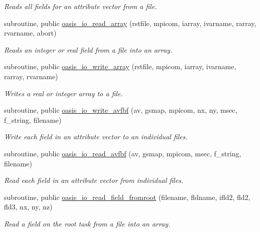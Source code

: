 \begin{DoxyCompactItemize}
\begin{DoxyCompactList}\small\item\em Reads all fields for an attribute vector from a file. \end{DoxyCompactList}\item 
subroutine, public \hyperlink{namespacemod__oasis__io_a8b604f89345d74c74c6bc3b4760b2e29}{oasis\+\_\+io\+\_\+read\+\_\+array} (rstfile, mpicom, iarray, ivarname, rarray, rvarname, abort)
\begin{DoxyCompactList}\small\item\em Reads an integer or real field from a file into an array. \end{DoxyCompactList}\item 
subroutine, public \hyperlink{namespacemod__oasis__io_a9ac8ce0ba3223fb59f7f003b50b229cf}{oasis\+\_\+io\+\_\+write\+\_\+array} (rstfile, mpicom, iarray, ivarname, rarray, rvarname)
\begin{DoxyCompactList}\small\item\em Writes a real or integer array to a file. \end{DoxyCompactList}\item 
subroutine, public \hyperlink{namespacemod__oasis__io_a42b325557a774b08d4cba24f387f8b01}{oasis\+\_\+io\+\_\+write\+\_\+avfbf} (av, gsmap, mpicom, nx, ny, msec, f\+\_\+string, filename)
\begin{DoxyCompactList}\small\item\em Write each field in an attribute vector to an individual files. \end{DoxyCompactList}\item 
subroutine, public \hyperlink{namespacemod__oasis__io_ac4a465a698824fb473074bfbd3d92f79}{oasis\+\_\+io\+\_\+read\+\_\+avfbf} (av, gsmap, mpicom, msec, f\+\_\+string, filename)
\begin{DoxyCompactList}\small\item\em Read each field in an attribute vector from individual files. \end{DoxyCompactList}\item 
subroutine, public \hyperlink{namespacemod__oasis__io_af080505b4678a5c68916a700f54ac6e6}{oasis\+\_\+io\+\_\+read\+\_\+field\+\_\+fromroot} (filename, fldname, ifld2, fld2, fld3, nx, ny, nz)
\begin{DoxyCompactList}\small\item\em Read a field on the root task from a file into an array. \end{DoxyCompactList}\item 

\end{DoxyCompactItemize}
